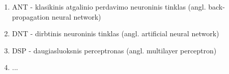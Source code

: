 \begin{enumerate}
\item ANT - klasikinis atgalinio perdavimo neuroninis tinklas (angl.
back-propagation neural network)
\item DNT - dirbtinis neuroninis tinklas (angl. artificial neural network)
\item DSP - daugiasluoksnis perceptronas (angl. multilayer perceptron)
\item ...
\end{enumerate}
